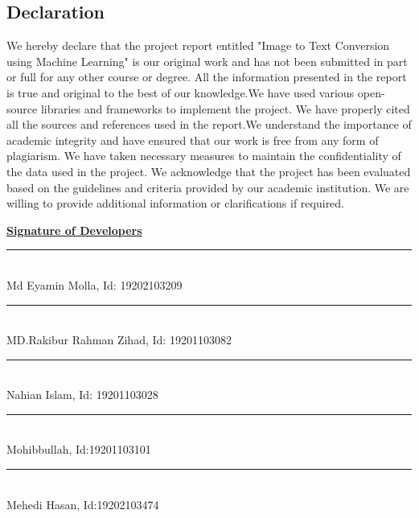 \begin{center}
    \section*{Declaration}
\end{center}
\large 


We hereby declare that the project report entitled "Image to Text Conversion using Machine Learning" is our original work and has not been submitted in part or full for any other course or degree. All the information presented in the report is true and original to the best of our knowledge.We have used various open-source libraries and frameworks to implement the project. We have properly cited all the sources and references used in the report.We understand the importance of academic integrity and have ensured that our work is free from any form of plagiarism. We have taken necessary measures to maintain the confidentiality of the data used in the project.
We acknowledge that the project has been evaluated based on the guidelines and criteria provided by our academic institution. We are willing to provide additional information or clarifications if required.


\begin{flushleft}

\textbf{\underline{Signature of Developers}} \null\hfill  

\vspace{10mm}
\noindent\rule{5.3cm}{0.2pt} \\
Md Eyamin Molla,  
Id: 19202103209  \null\hfill 
\vspace{10mm}

\noindent\rule{5.3cm}{0.2pt} \\
 MD.Rakibur Rahman Zihad,  Id: 19201103082 \\
\vspace{10mm}

\noindent\rule{5.3cm}{0.2pt} \\
Nahian Islam,   
Id: 19201103028  \\
\vspace{10mm}


\noindent\rule{5.3cm}{0.2pt} \\
Mohibbullah,
Id:19201103101 \\ 

\noindent\rule{5.3cm}{0.2pt} \\
Mehedi Hasan,
Id:19202103474 \\ 


\end{flushleft}